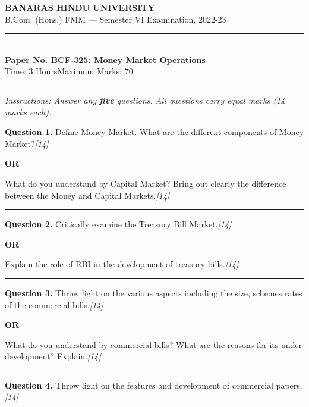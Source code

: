 \documentclass[11pt,a4paper]{article}
\newcommand{\pts}[1]{\hfill   \textit{[#1]}}
\begin{document}
\begin{center}
  {\large\bfseries BANARAS HINDU UNIVERSITY}\\[2pt]
  {\normalsize B.Com. (Hons.) FMM --- Semester VI Examination, 2022-23}\\[6pt]
  \rule{0.8\linewidth}{0.5pt}\\[6pt]
  {\large\bfseries Paper No. BCF-325: Money Market Operations}\\[4pt]
  {\normalsize Time: 3 Hours\hfill Maximum Marks: 70}
\end{center}

\rule{\linewidth}{0.4pt}

\smallskip



\noindent   \textit{Instructions: Answer any   \textbf{five} questions. All questions carry equal marks (14 marks each).}

\bigskip




\noindent   \textbf{Question 1.}
Define Money Market. What are the different components of Money Market?\pts{14}

\centerline{   \textbf{OR}}

What do you understand by Capital Market? Bring out clearly the difference between the Money and Capital Markets.\pts{14}

\medskip\rule{\linewidth}{0.2pt}




\noindent   \textbf{Question 2.}
Critically examine the Treasury Bill Market.\pts{14}

\centerline{   \textbf{OR}}

Explain the role of RBI in the development of treasury bills.\pts{14}

\medskip\rule{\linewidth}{0.2pt}




\noindent   \textbf{Question 3.}
Throw light on the various aspects including the size, schemes rates of the commercial bills.\pts{14}

\centerline{   \textbf{OR}}

What do you understand by commercial bills? What are the reasons for its under development? Explain.\pts{14}

\medskip\rule{\linewidth}{0.2pt}




\noindent   \textbf{Question 4.}
Throw light on the features and development of commercial papers.\pts{14}
\end{document}
